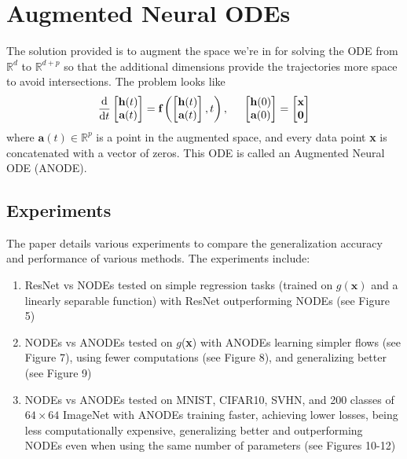 \documentclass[letterpaper,12 pt]{article}
\begin{document}
\section{Augmented Neural ODEs}
The solution provided is to augment the space we're in for solving the ODE from $\mathbb{R}^d$ to $\mathbb{R}^{d+p}$ so that the additional dimensions provide the trajectories more space to avoid intersections. The problem looks like
    \[\frac{\text{d}}{\text{d}t}\begin{bmatrix} \textbf{h}(t)\\ \textbf{a}(t) \end{bmatrix}=\textbf{f}\left( \begin{bmatrix} \textbf{h}(t)\\ \textbf{a}(t) \end{bmatrix},t \right),\hspace{5mm}\begin{bmatrix} \textbf{h}(0)\\ \textbf{a}(0) \end{bmatrix}=\begin{bmatrix} \textbf{x}\\ \textbf{0} \end{bmatrix} \]
\noindent where $\textbf{a}(t)\in \mathbb{R}^p$ is a point in the augmented space, and every data point \textbf{x} is concatenated with a vector of zeros. This ODE is called an Augmented Neural ODE (ANODE). 

\subsection{Experiments}
The paper details various experiments to compare the generalization accuracy and performance of various methods. The experiments include:
	\begin{enumerate}
	    \item ResNet vs NODEs tested on simple regression tasks (trained on $g(\textbf{x})$ and a linearly separable function) with ResNet outperforming NODEs (see Figure 5)
	    
	    \item NODEs vs ANODEs tested on $g$(\textbf{x}) with ANODEs learning simpler flows (see Figure 7), using fewer computations (see Figure 8), and generalizing better (see Figure 9) 
	    
	    \item NODEs vs ANODEs tested on MNIST, CIFAR10, SVHN, and 200 classes of $64\times 64$ ImageNet with ANODEs training faster, achieving lower losses, being less computationally expensive, generalizing better and outperforming NODEs even when using the same number of parameters (see Figures 10-12)
	\end{enumerate}
\end{document}
